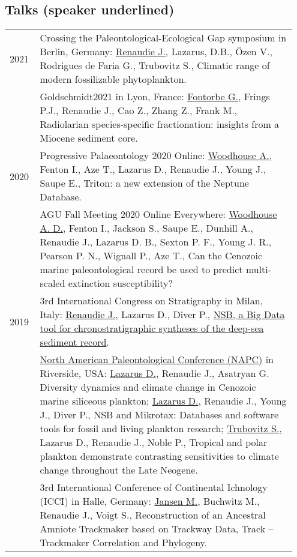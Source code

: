 \documentclass[11pt, a4paper]{article}
\begin{document}
\subsection[Talks]{Talks \textnormal{\footnotesize{(speaker underlined)}}}
\begin{longtable}{@{}p{0.1\linewidth} P{0.85\linewidth}@{}}
2021 & Crossing the Paleontological-Ecological Gap symposium in Berlin, Germany: \underline{Renaudie J.}, Lazarus, D.B., Özen V., Rodrigues de Faria G., Trubovitz S., Climatic range of modern fossilizable phytoplankton.\\
& Goldschmidt2021 in Lyon, France: \underline{Fontorbe G.}, Frings P.J., Renaudie J., Cao Z., Zhang Z., Frank M., Radiolarian species-specific fractionation: insights from a Miocene sediment core.\\
2020 & Progressive Palaeontology 2020 Online: \underline{Woodhouse A.}, Fenton I., Aze T., Lazarus D., Renaudie J., Young J., Saupe E., Triton: a new extension of the Neptune Database.\\
 & AGU Fall Meeting 2020 Online Everywhere: \underline{Woodhouse A. D.}, Fenton I., Jackson S., Saupe E., Dunhill A., Renaudie J., Lazarus D. B., Sexton P. F., Young J. R., Pearson P. N., Wignall P., Aze T., Can the Cenozoic marine paleontological record be used to predict multi-scaled extinction susceptibility? \\
2019 & 3rd International Congress on Stratigraphy in Milan, Italy: \underline{Renaudie J.}, Lazarus D., Diver P., \href{http://plannapus.github.io/data/20190723Potsdam.pdf}{NSB, a Big Data tool for chronostratigraphic syntheses of the deep-sea sediment record}.\\
 & \href{https://escholarship.org/uc/item/6r18f8wn}{North American Paleontological Conference (NAPC)} in Riverside, USA: \underline{Lazarus D.}, Renaudie J., Asatryan G. Diversity dynamics and climate change in Cenozoic marine siliceous plankton; \underline{Lazarus D.}, Renaudie J., Young J., Diver P., NSB and Mikrotax: Databases and software tools for fossil and living plankton research; \underline{Trubovitz S.}, Lazarus D., Renaudie J., Noble P., Tropical and polar plankton demonstrate contrasting sensitivities to climate change throughout the Late Neogene.\\
 & 3rd International Conference of Continental Ichnology (ICCI) in Halle, Germany: \underline{Jansen M.}, Buchwitz M., Renaudie J., Voigt S., Reconstruction of an Ancestral Amniote Trackmaker based on Trackway Data, Track -- Trackmaker Correlation and Phylogeny.\\

\end{longtable}
\end{document}
